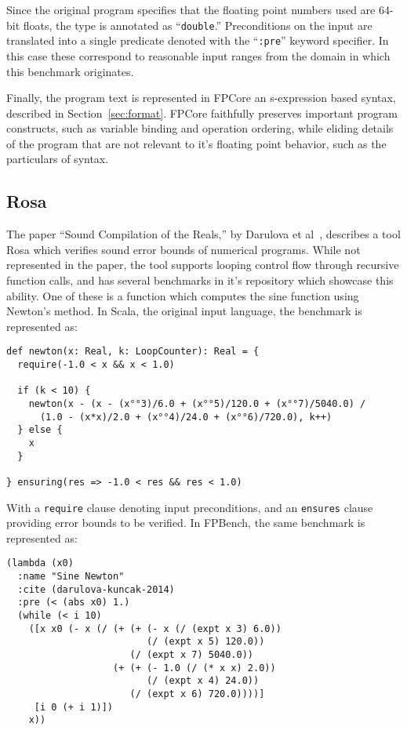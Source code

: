 \documentclass[main.tex]{subfiles}
\begin{document}
Since the original program specifies that the floating point numbers
used are 64-bit floats, the type is annotated as ``\verb|double|.''
Preconditions on the input are translated into a single predicate
denoted with the ``\verb|:pre|'' keyword specifier. In this case these
correspond to reasonable input ranges from the domain in which this
benchmark originates.

Finally, the program text is represented in FPCore an s-expression
based syntax, described in Section~\ref{sec:format}. FPCore faithfully
preserves important program constructs, such as variable binding and
operation ordering, while eliding details of the program that are not
relevant to it's floating point behavior, such as the particulars of
syntax.

\subsection{Rosa}
The paper ``Sound Compilation of the Reals,'' by Darulova et
al~\cite{DarulovaK14}, describes a tool Rosa which verifies sound
error bounds of numerical programs. While not represented in the
paper, the tool supports looping control flow through recursive
function calls, and has several benchmarks in it's repository which
showcase this ability. One of these is a function which computes the
sine function using Newton's method. In Scala, the original input
language, the benchmark is represented as:

\begin{verbatim}
def newton(x: Real, k: LoopCounter): Real = {
  require(-1.0 < x && x < 1.0)

  if (k < 10) {
    newton(x - (x - (x°°3)/6.0 + (x°°5)/120.0 + (x°°7)/5040.0) / 
      (1.0 - (x*x)/2.0 + (x°°4)/24.0 + (x°°6)/720.0), k++)
  } else {
    x
  }
  
} ensuring(res => -1.0 < res && res < 1.0)
\end{verbatim}

With a \verb|require| clause denoting input preconditions, and an
\verb|ensures| clause providing error bounds to be verified. In
FPBench, the same benchmark is represented as:

\begin{verbatim}
(lambda (x0)
  :name "Sine Newton"
  :cite (darulova-kuncak-2014)
  :pre (< (abs x0) 1.)
  (while (< i 10)
    ([x x0 (- x (/ (+ (+ (- x (/ (expt x 3) 6.0)) 
                         (/ (expt x 5) 120.0))
                      (/ (expt x 7) 5040.0))
                   (+ (+ (- 1.0 (/ (* x x) 2.0)) 
                         (/ (expt x 4) 24.0)) 
                      (/ (expt x 6) 720.0))))]
     [i 0 (+ i 1)])
    x))
\end{verbatim}
\end{document}

